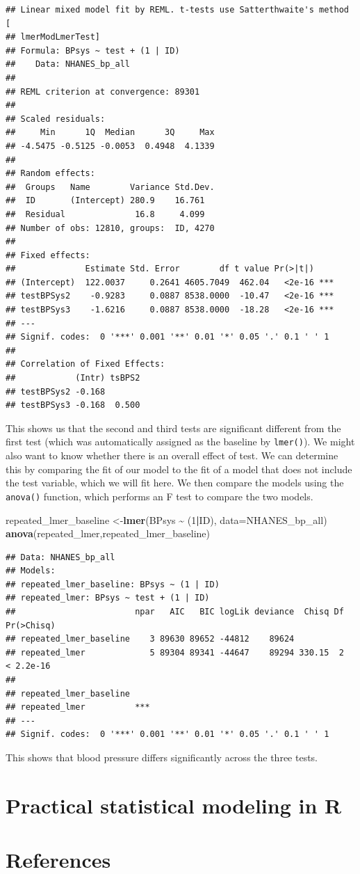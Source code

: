 \documentclass[
  12pt,
]{book}
\newenvironment{Shaded}{\begin{snugshade}}{\end{snugshade}}
\newcommand{\AttributeTok}[1]{\textcolor[rgb]{0.13,0.29,0.53}{#1}}
\newcommand{\DecValTok}[1]{\textcolor[rgb]{0.00,0.00,0.81}{#1}}
\newcommand{\FunctionTok}[1]{\textcolor[rgb]{0.13,0.29,0.53}{\textbf{#1}}}
\newcommand{\NormalTok}[1]{#1}
\newcommand{\OtherTok}[1]{\textcolor[rgb]{0.56,0.35,0.01}{#1}}
\newcommand{\SpecialCharTok}[1]{\textcolor[rgb]{0.81,0.36,0.00}{\textbf{#1}}}
\begin{document}
\begin{verbatim}
## Linear mixed model fit by REML. t-tests use Satterthwaite's method [
## lmerModLmerTest]
## Formula: BPsys ~ test + (1 | ID)
##    Data: NHANES_bp_all
## 
## REML criterion at convergence: 89301
## 
## Scaled residuals: 
##     Min      1Q  Median      3Q     Max 
## -4.5475 -0.5125 -0.0053  0.4948  4.1339 
## 
## Random effects:
##  Groups   Name        Variance Std.Dev.
##  ID       (Intercept) 280.9    16.761  
##  Residual              16.8     4.099  
## Number of obs: 12810, groups:  ID, 4270
## 
## Fixed effects:
##              Estimate Std. Error        df t value Pr(>|t|)    
## (Intercept)  122.0037     0.2641 4605.7049  462.04   <2e-16 ***
## testBPSys2    -0.9283     0.0887 8538.0000  -10.47   <2e-16 ***
## testBPSys3    -1.6216     0.0887 8538.0000  -18.28   <2e-16 ***
## ---
## Signif. codes:  0 '***' 0.001 '**' 0.01 '*' 0.05 '.' 0.1 ' ' 1
## 
## Correlation of Fixed Effects:
##            (Intr) tsBPS2
## testBPSys2 -0.168       
## testBPSys3 -0.168  0.500
\end{verbatim}

This shows us that the second and third tests are significant different from the first test (which was automatically assigned as the baseline by \texttt{lmer()}). We might also want to know whether there is an overall effect of test. We can determine this by comparing the fit of our model to the fit of a model that does not include the test variable, which we will fit here. We then compare the models using the \texttt{anova()} function, which performs an F test to compare the two models.

\begin{Shaded}
\begin{Highlighting}[]
\NormalTok{repeated\_lmer\_baseline }\OtherTok{\textless{}{-}}\FunctionTok{lmer}\NormalTok{(BPsys }\SpecialCharTok{\textasciitilde{}}\NormalTok{ (}\DecValTok{1}\SpecialCharTok{|}\NormalTok{ID), }\AttributeTok{data=}\NormalTok{NHANES\_bp\_all)}
\FunctionTok{anova}\NormalTok{(repeated\_lmer,repeated\_lmer\_baseline)}
\end{Highlighting}
\end{Shaded}

\begin{verbatim}
## Data: NHANES_bp_all
## Models:
## repeated_lmer_baseline: BPsys ~ (1 | ID)
## repeated_lmer: BPsys ~ test + (1 | ID)
##                        npar   AIC   BIC logLik deviance  Chisq Df Pr(>Chisq)
## repeated_lmer_baseline    3 89630 89652 -44812    89624                     
## repeated_lmer             5 89304 89341 -44647    89294 330.15  2  < 2.2e-16
##                           
## repeated_lmer_baseline    
## repeated_lmer          ***
## ---
## Signif. codes:  0 '***' 0.001 '**' 0.01 '*' 0.05 '.' 0.1 ' ' 1
\end{verbatim}

This shows that blood pressure differs significantly across the three tests.

\hypertarget{practical-statistical-modeling-in-r}{%
\chapter{Practical statistical modeling in R}\label{practical-statistical-modeling-in-r}}

\hypertarget{references}{%
\chapter{References}\label{references}}
\end{document}
